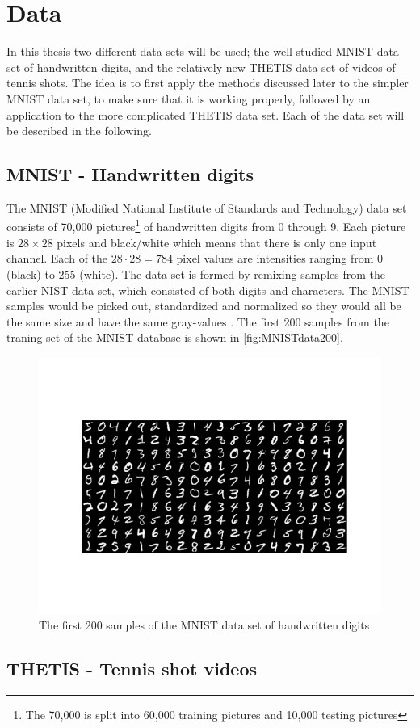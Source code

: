 \section{Data}

In this thesis two different data sets will be used; the well-studied MNIST data set \cite{MNIST} of handwritten digits, and the relatively new THETIS data set \cite{Gourgari2013} of videos of tennis shots. The idea is to first apply the methods discussed later to the simpler MNIST data set, to make sure that it is working properly, followed by an application to the more complicated THETIS data set. Each of the data set will be described in the following. 

\subsection{MNIST - Handwritten digits}
The MNIST (Modified National Institute of Standards and Technology) data set \cite{MNIST} consists of 70,000 pictures\footnote{The 70,000 is split into 60,000 training pictures and 10,000 testing pictures} of handwritten digits from 0 through 9. Each picture is $28\times 28$ pixels and black/white which means that there is only one input channel. Each of the $28\cdot 28 = 784$ pixel values are intensities ranging from 0 (black) to 255 (white). The data set is formed by remixing samples from the earlier NIST data set, which consisted of both digits and characters. The MNIST samples would be picked out, standardized and normalized so they would all be the same size and have the same gray-values \cite{mnistdatabase}. The first 200 samples from the traning set of the MNIST database is shown in \autoref{fig:MNISTdata200}. 

\begin{figure}[ht]
    \centering
    \includegraphics[width=\linewidth]{Pics/04_Data/MNIST.png}
    \caption{The first 200 samples of the MNIST data set of handwritten digits}
    \label{fig:MNISTdata200}
\end{figure}

\subsection{THETIS - Tennis shot videos}
